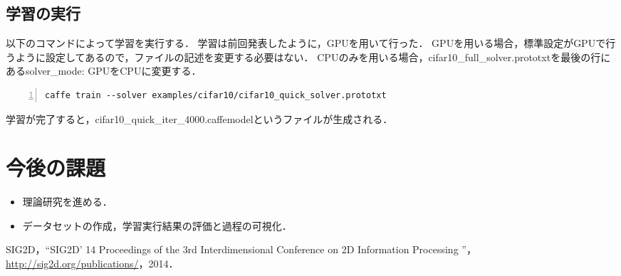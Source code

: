 \documentclass[a4paper,10pt]{jsarticle}
\begin{document}
\subsection{学習の実行}
以下のコマンドによって学習を実行する．
学習は前回発表したように，GPUを用いて行った．
GPUを用いる場合，標準設定がGPUで行うように設定してあるので，ファイルの記述を変更する必要はない．
CPUのみを用いる場合，cifar10\_full\_solver.prototxtを最後の行にあるsolver\_mode: GPUをCPUに変更する．

\begin{lstlisting}[basicstyle=\ttfamily\footnotesize, frame=single, firstnumber=1, numbers=left, breaklines=true]
caffe train --solver examples/cifar10/cifar10_quick_solver.prototxt
\end{lstlisting}

学習が完了すると，cifar10\_quick\_iter\_4000.caffemodelというファイルが生成される．

\section{今後の課題}
\begin{itemize}
 \item 理論研究を進める．
 \item データセットの作成，学習実行結果の評価と過程の可視化．
\end{itemize}


\begin{thebibliography}{99}
   SIG2D，``SIG2D' 14 Proceedings of the 3rd Interdimensional Conference on 2D Information Processing ''，\url{http://sig2d.org/publications/}，2014．
\end{thebibliography}
\end{document}
